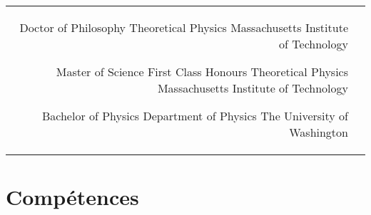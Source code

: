 \documentclass[10pt]{article} %
\begin{document}
\begin{paracol}{2}

  \begin{supertabular}{rl} %


    {Doctor of Philosophy} %
    {} %
    {Theoretical Physics} %
    {Massachusetts Institute of Technology} %


    {Master of Science} %
    {First Class Honours} %
    {Theoretical Physics} %
    {Massachusetts Institute of Technology} %


    {Bachelor of Physics} %
    {} %
    {Department of Physics} %
    {The University of Washington} %


  \end{supertabular}


  \section{Compétences}






\end{paracol}
\end{document}
